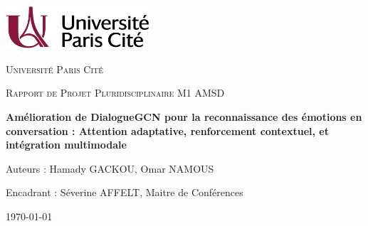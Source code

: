 \documentclass[a4paper,11pt]{article}
\begin{document}
\begin{titlepage}
  \centering
  \includegraphics[width=0.4\textwidth]{images/logo_uni.png}\par\vspace{1cm}
  {\scshape\LARGE Université Paris Cité\par}
  \vspace{1cm}
  {\scshape\Large Rapport de Projet Pluridisciplinaire M1 AMSD\par}
  \vspace{1.5cm}
  {\huge\bfseries Amélioration de DialogueGCN pour la reconnaissance des émotions en conversation : Attention adaptative, renforcement contextuel, et intégration multimodale\par}
  \vfill
  {\large Auteurs : Hamady GACKOU, Omar NAMOUS\par}
  {\large Encadrant : Séverine AFFELT, Maitre de Conférences\par}
  \vspace{1cm}
  {\large \today}\par
\end{titlepage}

\end{document}
